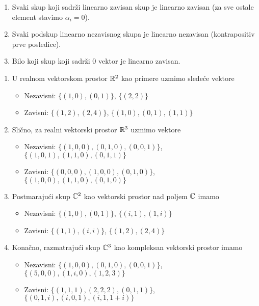 \documentclass{article}
\begin{document}
\begin{corollary}
  \begin{enumerate}
    \item Svaki skup koji sadrži linearno zavisan skup je linearno zavisan (za sve ostale element stavimo $\alpha_i = 0$).
    \item Svaki podskup linearno nezavisnog skupa je linearno nezavisan (kontrapositiv prve posledice).
    \item Bilo koji skup koji sadrži $0$ vektor je linearno zavisan.
  \end{enumerate}
\end{corollary}

\begin{example}
  \begin{enumerate}
    \item U realnom vektorskom prostor $\mathbb{R}^2$ kao primere uzmimo sledeće vektore
      \begin{itemize}
        \item Nezavisni: $\{(1, 0), (0, 1)\}$, $\{(2, 2)\}$
        \item Zavisni: $\{(1, 2), (2, 4)\}$, $\{(1, 0), (0, 1), (1, 1)\}$
      \end{itemize}
    \item Slično, za realni vektorski prostor $\mathbb{R}^3$ uzmimo vektore
      \begin{itemize}
        \item Nezavisni: $\{(1, 0, 0), (0, 1, 0), (0, 0, 1)\}$, $\{(1, 0, 1), (1, 1, 0), (0, 1, 1)\}$
        \item Zavisni: $\{(0, 0, 0), (1, 0, 0), (0, 1, 0)\}$, $\{(1, 0, 0), (1, 1, 0), (0, 1, 0)\}$
      \end{itemize}
    \item Postmarajući skup $\mathbb{C}^2$ kao vektorski prostor nad poljem $\mathbb{C}$ imamo
      \begin{itemize}
        \item Nezavisni: $\{(1, 0), (0, 1)\}$, $\{(i, 1), (1, i)\}$
        \item Zavisni: $\{(1, 1), (i, i)\}$, $\{(1, 2), (2, 4)\}$
      \end{itemize}
    \item Konačno, razmatrajući skup $\mathbb{C}^3$ kao kompleksan vektorski prostor imamo
      \begin{itemize}
        \item Nezavisni: $\{(1, 0, 0), (0, 1, 0), (0, 0, 1)\}$, $\{(5, 0, 0), (1, i, 0), (1, 2, 3)\}$
        \item Zavisni: $\{(1, 1, 1), (2, 2, 2), (0, 1, 1)\}$, $\{(0, 1, i), (i, 0, 1), (i, 1, 1 + i)\}$
      \end{itemize}
  \end{enumerate}
\end{example}
\end{document}
